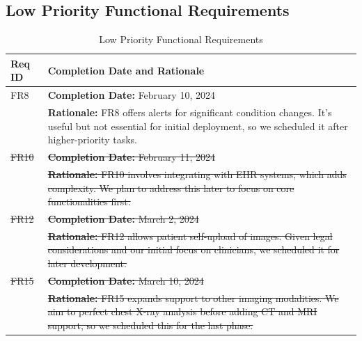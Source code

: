 \documentclass[12pt]{article}
\begin{document}
  \subsection{Low Priority Functional Requirements}
\begin{table}[H]
  \label{TblLowPriorityFRs}
  \begin{tabular}{p{}|p{}}
  \toprule
  \textbf{Req ID} & \textbf{Completion Date and Rationale} \\
  \midrule
  FR8 & \textbf{Completion Date:} February 10, 2024\\
      & \textbf{Rationale:} FR8 offers alerts for significant condition changes. It's useful but not essential for initial deployment, so we scheduled it after higher-priority tasks. \\
  \midrule
  \sout{FR10} & \sout{\textbf{Completion Date:} February 11, 2024}\\
       & \sout{\textbf{Rationale:} FR10 involves integrating with EHR systems, which adds complexity. We plan to address this later to focus on core functionalities first.} \\
  \midrule
  \sout{FR12} & \sout{\textbf{Completion Date:} March 2, 2024}\\
       & \sout{\textbf{Rationale:} FR12 allows patient self-upload of images. Given legal considerations and our initial focus on clinicians, we scheduled it for later development.} \\
  \midrule
  \sout{FR15} & \sout{\textbf{Completion Date:} March 10, 2024}\\
       & \sout{\textbf{Rationale:} FR15 expands support to other imaging modalities. We aim to perfect chest X-ray analysis before adding CT and MRI support, so we scheduled this for the last phase.} \\
  \bottomrule
  \end{tabular}
  \caption{Low Priority Functional Requirements}
  \end{table}
  
\end{document}
